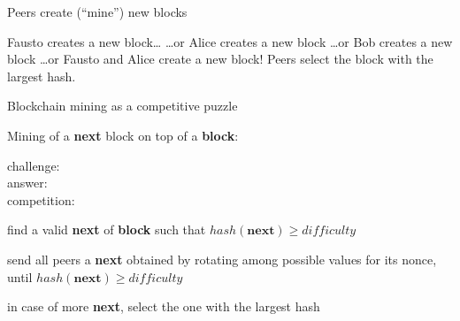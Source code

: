 \documentclass[11pt]{beamer}  %
\newcommand{\hash}{{\mathit{hash}}}
\newcommand{\difficulty}{{\mathit{difficulty}}}
\begin{document}
\begin{frame}{Peers create (``mine'') new blocks}
\begin{center}
\begin{tikzpicture}[scale=0.5,>=Stealth]
    \end{tikzpicture}
  \end{center}

  \begin{overprint}
    \centering Fausto creates a new block\ldots
    \centering \ldots or Alice creates a new block
    \centering \ldots or Bob creates a new block
    \centering \ldots or Fausto and Alice create a new block!
    \centering Peers select the block with the largest hash.
  \end{overprint}

\end{frame}

\begin{frame}{Blockchain mining as a competitive puzzle}

  Mining of a \textbf{next} block on top of a \textbf{block}:
  \quad{}

  \begin{description}
  \item[{\color{red}challenge:}] 
  \item[{\color{red}answer:}] 
  \item[{\color{red}competition:}] 
  \end{description}

  \bigskip
  \begin{description}
  \item<6->[{\color{red}challenge:}] find a valid \textbf{next} of \textbf{block}
    such that $\hash(\mathbf{next})\ge\difficulty$
  \item<7->[{\color{red}answer:}] send all peers a \textbf{next} obtained
    by rotating among possible values for its nonce, until $\hash(\mathbf{next})\ge\difficulty$
  \item<8->[{\color{red}competition:}] in case of more \textbf{next}, select the one with the largest hash
  \end{description}

\end{frame}
\end{document}
